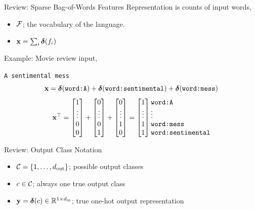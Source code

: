 \documentclass{beamer}
\begin{document}
\begin{frame}{Review: Sparse Bag-of-Words Features}
  Representation is counts of input words,
  \begin{itemize}
  \item $\mathcal{F}$; the vocabulary of the language.
  \item $\mathbf{x} = \sum_{i} \boldsymbol{\delta}(f_i)$
  \end{itemize}

  Example: Movie review input,
  \begin{center}
    \texttt{A sentimental mess}
    \[ \mathbf{x} = \boldsymbol{\delta}(\texttt{word:A}) + \boldsymbol{\delta}(\texttt{word:sentimental}) +
    \boldsymbol{\delta}(\texttt{word:mess}) \]
    \[ \boldx^\top =\begin{bmatrix} 1 \\ \vdots
        \\ 0\\ 0 \\ \end{bmatrix} +\begin{bmatrix} 0 \\
        \vdots \\ 0\\ 1 \\ \end{bmatrix} +
     \begin{bmatrix} 0 \\ \vdots \\ 1\\ 0 \\ \end{bmatrix}
    =\begin{bmatrix} 1 \\ \vdots \\ 1 \\ 1 \\ \end{bmatrix}
    \begin{matrix*}[l] \mathrm{\texttt{word:A}} \\ \vdots \\ \mathrm{\texttt{word:mess}} \\ \mathrm{\texttt{word:sentimental}} \\ \end{matrix*}
     \]
  \end{center}
\end{frame}



\begin{frame}{Review: Output Class Notation}
  \begin{itemize}
  \item $\mathcal{C} = \{1, \ldots, {d_{\mathrm{out}}}\}$; possible output classes
  \item $c \in \mathcal{C}$; always one true output class
  \item $\mathbf{y} = \boldsymbol{\delta}(c) \in \mathbb{R}^{1\times {d_{\mathrm{in}}}}$; true one-hot output representation

  \end{itemize}
\end{frame}
\end{document}
